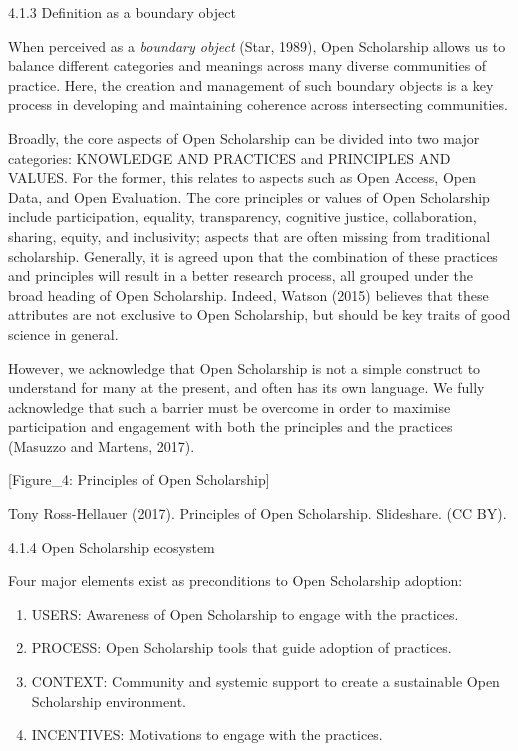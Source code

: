 \documentclass[]{article}
\begin{document}
4.1.3 Definition as a boundary object

When perceived as a \emph{boundary object} (Star, 1989), Open
Scholarship allows us to balance different categories and meanings
across many diverse communities of practice. Here, the creation and
management of such boundary objects is a key process in developing and
maintaining coherence across intersecting communities.

Broadly, the core aspects of Open Scholarship can be divided into two
major categories: KNOWLEDGE AND PRACTICES and PRINCIPLES AND VALUES. For
the former, this relates to aspects such as Open Access, Open Data, and
Open Evaluation. The core principles or values of Open Scholarship
include participation, equality, transparency, cognitive justice,
collaboration, sharing, equity, and inclusivity; aspects that are often
missing from traditional scholarship. Generally, it is agreed upon that
the combination of these practices and principles will result in a
better research process, all grouped under the broad heading of Open
Scholarship. Indeed, Watson (2015) believes that these attributes are
not exclusive to Open Scholarship, but should be key traits of good
science in general.

However, we acknowledge that Open Scholarship is not a simple construct
to understand for many at the present, and often has its own language.
We fully acknowledge that such a barrier must be overcome in order to
maximise participation and engagement with both the principles and the
practices (Masuzzo and Martens, 2017).

{[}Figure\_4: Principles of Open Scholarship{]}

Tony Ross-Hellauer (2017). Principles of Open Scholarship. Slideshare.
(CC BY).

4.1.4 Open Scholarship ecosystem

Four major elements exist as preconditions to Open Scholarship adoption:

\begin{enumerate}
\def\labelenumi{\arabic{enumi}.}
\item
  USERS: Awareness of Open Scholarship to engage with the practices.
\item
  PROCESS: Open Scholarship tools that guide adoption of practices.
\item
  CONTEXT: Community and systemic support to create a sustainable Open
  Scholarship environment.
\item
  INCENTIVES: Motivations to engage with the practices.
\end{enumerate}
\end{document}
